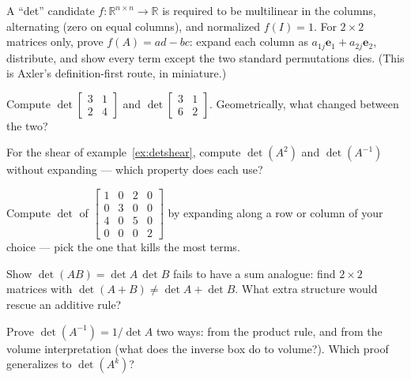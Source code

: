 \begin{exercise}[hard]
A ``det'' candidate $f:\mathbb R^{n\times n}\to\mathbb R$ is required to be
multilinear in the columns, alternating (zero on equal columns), and
normalized $f(I)=1$. For $2\times2$ matrices only, prove
$f(A)=ad-bc$: expand each column as $a_{1j}\mathbf e_1+a_{2j}\mathbf e_2$,
distribute, and show every term except the two standard permutations
dies. (This is Axler's definition-first route, in miniature.)
\end{exercise}
\begin{exercise}[easy]
Compute $\det\begin{bmatrix}3&1\\2&4\end{bmatrix}$ and
$\det\begin{bmatrix}3&1\\6&2\end{bmatrix}$. Geometrically, what changed
between the two?
\end{exercise}
\begin{exercise}[easy]
For the shear of example~\ref{ex:detshear}, compute
$\det(A^2)$ and $\det(A^{-1})$ without expanding --- which property
does each use?
\end{exercise}
\begin{exercise}[medium]
Compute $\det$ of
$\begin{bmatrix}1&0&2&0\\0&3&0&0\\4&0&5&0\\0&0&0&2\end{bmatrix}$
by expanding along a row or column of your choice --- pick the one that
kills the most terms.
\end{exercise}
\begin{exercise}[medium]
Show $\det(AB)=\det A\,\det B$ fails to have a sum analogue:
find $2\times2$ matrices with $\det(A+B)\neq\det A+\det B$. What extra
structure would rescue an additive rule?
\end{exercise}
\begin{exercise}[hard]
Prove $\det(A^{-1})=1/\det A$ two ways: from the product rule, and
from the volume interpretation (what does the inverse box do to
volume?). Which proof generalizes to $\det(A^k)$?
\end{exercise}

